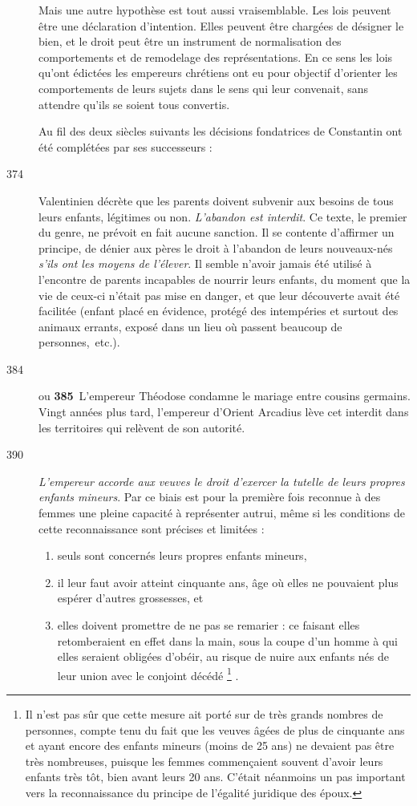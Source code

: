 \begin{description}
 Mais une autre hypothèse est tout aussi vraisemblable. Les lois peuvent être une déclaration d'intention. Elles peuvent être chargées de désigner le bien, et le droit peut être un instrument de normalisation des comportements et de remodelage des représentations. En ce sens les lois qu'ont édictées les empereurs chrétiens ont eu pour objectif d'orienter les comportements de leurs sujets dans le sens qui leur convenait, sans attendre qu'ils se soient tous convertis. 

 Au fil des deux siècles suivants les décisions fondatrices de Constantin ont été complétées par ses successeurs : 

\item[374] Valentinien décrète que les parents doivent subvenir aux besoins de tous leurs enfants, légitimes ou non. \emph{L'abandon est interdit}. Ce texte, le premier du genre, ne prévoit en fait aucune sanction. Il se contente d'affirmer un principe, de dénier aux pères le droit à l'abandon de leurs nouveaux-nés \emph{s'ils ont les moyens de l'élever}. Il semble n'avoir jamais été utilisé à l'encontre de parents incapables de nourrir leurs enfants, du moment que la vie de ceux-ci n'était pas mise en danger, et que leur découverte avait été facilitée (enfant placé en évidence, protégé des intempéries et surtout des animaux errants, exposé dans un lieu où passent beaucoup de personnes,~etc.). 

\item[384] $\!$ou \textbf{385}\,{} L'empereur Théodose condamne le mariage entre cousins germains. Vingt années plus tard, l'empereur d'Orient Arcadius lève cet interdit dans les territoires qui relèvent de son autorité. 

\item[390] \emph{L'empereur accorde aux veuves le droit d'exercer la tutelle de leurs propres enfants mineurs}. Par ce biais est pour la première fois reconnue à des femmes une pleine capacité à représenter autrui, même si les conditions de cette reconnaissance sont précises et limitées :
\begin{enumerate}[leftmargin=*,itemsep=0pt]
\item seuls sont concernés leurs propres enfants mineurs,
\item il leur faut avoir atteint cinquante ans, âge où elles ne pouvaient plus espérer d'autres grossesses, et
\item elles doivent promettre de ne pas se remarier : ce faisant elles retomberaient en effet dans la main, sous la coupe d'un homme à qui elles seraient obligées d'obéir, au risque de nuire aux enfants nés de leur union avec le conjoint décédé%
\footnote{Il n'est pas sûr que cette mesure ait porté sur de très grands nombres de personnes, compte tenu du fait que les veuves âgées de plus de cinquante ans et ayant encore des enfants mineurs (moins de 25 ans) ne devaient pas être très nombreuses, puisque les femmes commençaient souvent d'avoir leurs enfants très tôt, bien avant leurs 20 ans. C'était néanmoins un pas important vers la reconnaissance du principe de l'égalité juridique des époux.}%
.
\end{enumerate}


\end{description}
